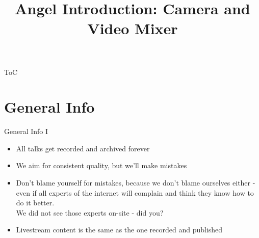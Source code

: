 \documentclass[aspectratio=169]{beamer}
\title{Angel Introduction: Camera and Video Mixer}
\author{}
\institute{C3VOC}
\begin{document}
\maketitle

\begin{frame}{ToC}
	\tableofcontents
\end{frame}


\section{General Info}
\begin{frame}{General Info I}
	\begin{itemize}
		\item All talks get recorded and archived forever
		\item We aim for consistent quality, but we'll make mistakes
		\item Don't blame yourself for mistakes, because we don't blame ourselves either - even if all experts of the internet will complain and think they know how to do it better. \\ We did not see those experts on-site - did you?
		\item Livestream content is the same as the one recorded and published
	\end{itemize}
\end{frame}
\end{document}

